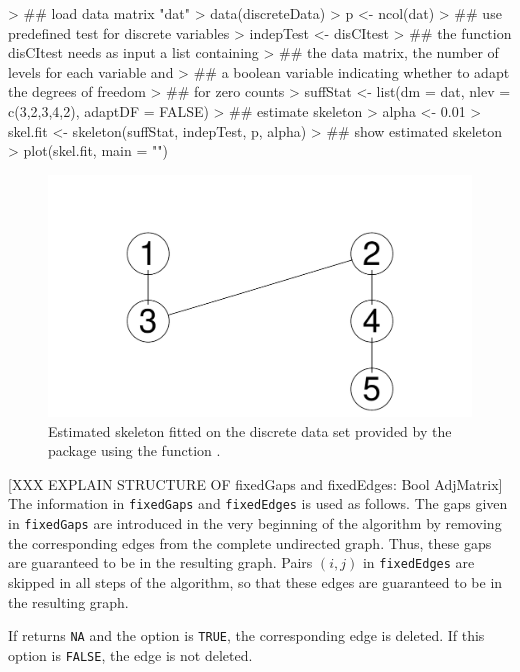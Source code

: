 \documentclass[article]{jss}
\begin{document}
\begin{Schunk}
\begin{Sinput}
> ## load data matrix "dat"
> data(discreteData)
> p <- ncol(dat)
> ## use predefined test for discrete variables
> indepTest <- disCItest
> ## the function disCItest needs as input a list containing
> ## the data matrix, the number of levels for each variable and 
> ## a boolean variable indicating whether to adapt the degrees of freedom
> ## for zero counts
> suffStat <- list(dm = dat, nlev = c(3,2,3,4,2), adaptDF = FALSE)
> ## estimate skeleton 
> alpha <- 0.01 
> skel.fit <- skeleton(suffStat, indepTest, p, alpha)
> ## show estimated skeleton
> plot(skel.fit, main = "")
\end{Sinput}
\end{Schunk}
\begin{figure}
  \begin{center}
\includegraphics{pcalgDoc-skelExp2Plot}
\caption{Estimated skeleton fitted on the discrete data set provided by the
  package using the function .}
\label{fig:skel2}
\end{center}
\end{figure}

[XXX EXPLAIN STRUCTURE OF fixedGaps and fixedEdges: Bool AdjMatrix] The information in \texttt{fixedGaps} and \texttt{fixedEdges} is used as
follows.  The gaps given in \texttt{fixedGaps} are introduced in the very
beginning of the algorithm by removing the corresponding edges from the
complete undirected graph. Thus, these gaps are guaranteed to be in the
resulting graph. Pairs $(i,j)$ in \texttt{fixedEdges} are skipped in
all steps of the algorithm, so that these edges are guaranteed to be in the
resulting graph.

If  returns \texttt{NA} and the option  is
\texttt{TRUE}, the corresponding edge is deleted. If this option is
\texttt{FALSE}, the edge is not deleted.
\end{document}
